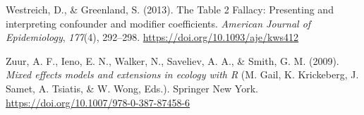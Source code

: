\documentclass[
]{article}
\newlength{\cslhangindent}
\newenvironment{CSLReferences}[2] %
 {\begin{list}{}{%
  \setlength{\itemindent}{0pt}
  \setlength{\leftmargin}{0pt}
  \setlength{\parsep}{0pt}
  \ifodd #1
   \setlength{\leftmargin}{\cslhangindent}
   \setlength{\itemindent}{-1\cslhangindent}
  \fi
  \setlength{\itemsep}{#2\baselineskip}}}
 {\end{list}}
\begin{document}
\begin{CSLReferences}{1}{0}
Westreich, D., \& Greenland, S. (2013). The {Table} 2 {Fallacy}: Presenting and interpreting confounder and modifier coefficients. \emph{American Journal of Epidemiology}, \emph{177}(4), 292--298. \url{https://doi.org/10.1093/aje/kws412}

Zuur, A. F., Ieno, E. N., Walker, N., Saveliev, A. A., \& Smith, G. M. (2009). \emph{Mixed effects models and extensions in ecology with {R}} (M. Gail, K. Krickeberg, J. Samet, A. Tsiatis, \& W. Wong, Eds.). {Springer New York}. \url{https://doi.org/10.1007/978-0-387-87458-6}

\end{CSLReferences}
\end{document}
